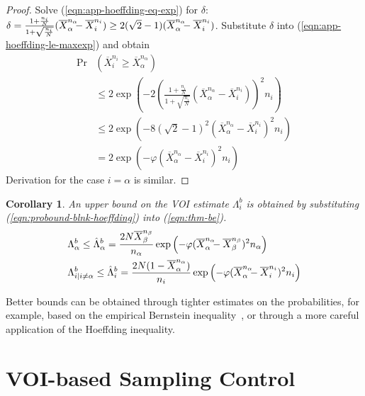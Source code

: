 \documentclass[]{article}
\newtheorem{crl}{Corollary}
\begin{document}
\begin{proof}
Solve (\ref{eqn:app-hoeffding-eq-exp}) for $\delta$: $\delta=\frac {1+\frac {n_i} N} {1+\sqrt {\frac {n_i} N}} (\overline X_\alpha^{n_\alpha}\hspace{-0.5em}
- \overline X_i^{n_i}) \ge 2(\sqrt 2 - 1)(\overline X_\alpha^{n_\alpha}\hspace{-0.5em}-\overline X_i^{n_i})$. Substitute $\delta$ into 
(\ref{eqn:app-hoeffding-le-maxexp}) and obtain
\begin{align}
\Pr&(\overline X_i^{n_i}\ge \overline X_\alpha^{n_\alpha}) \nonumber\\
& \le 2\exp\left(-2\left( \frac {1+\frac {n_i} N} {1+\sqrt {\frac {n_i} N}}
                          (\overline X_\alpha^{n_\alpha} - \overline X_i^{n_i})\right)^2 n_i\right)\nonumber \\
& \le 2\exp(-8(\sqrt 2 - 1)^2(\overline X_\alpha^{n_\alpha} - \overline X_i^{n_i})^2n_i)\nonumber\\
& = 2\exp(-\varphi(\overline X_\alpha^{n_\alpha} - \overline X_i^{n_i})^2n_i)
\end{align}
Derivation for the case $i=\alpha$ is similar.
\end{proof}

\begin{crl}
An upper bound on the VOI estimate $\Lambda_i^b$ is obtained
by substituting (\ref{eqn:probound-blnk-hoeffding}) into (\ref{eqn:thm-be}).
\begin{align}
  \label{eqn:bound-blnk-hoeffding}
  \Lambda&_\alpha^b \le \hat\Lambda_\alpha^b=\frac {2N\overline X_\beta^{n_\beta}} {n_\alpha}\exp\left(- \varphi(\overline X_\alpha^{n_\alpha}\hspace{-0.5em} - \overline X_\beta^{n_\beta})^2 n_\alpha\right)\nonumber\\
  \Lambda&_{i|i\ne\alpha}^b\le \hat\Lambda_i^b=  \frac {2N(1-\overline  X_\alpha^{n_\alpha})} {n_i}\exp\left(- \varphi(\overline X_\alpha^{n_\alpha}\hspace{-0.5em} - \overline X_i^{n_i})^2 n_i\right)
\end{align}
\label{crl:bound-blnk-hoeffding}
\end{crl}
\vspace{-2em}
Better bounds can be obtained through tighter estimates on the
probabilities, for example, based on the empirical Bernstein
inequality~\cite{MaurerPontil.benrstein}, or through a more careful
application of the Hoeffding inequality.

\section{VOI-based Sampling Control}
\end{document}
